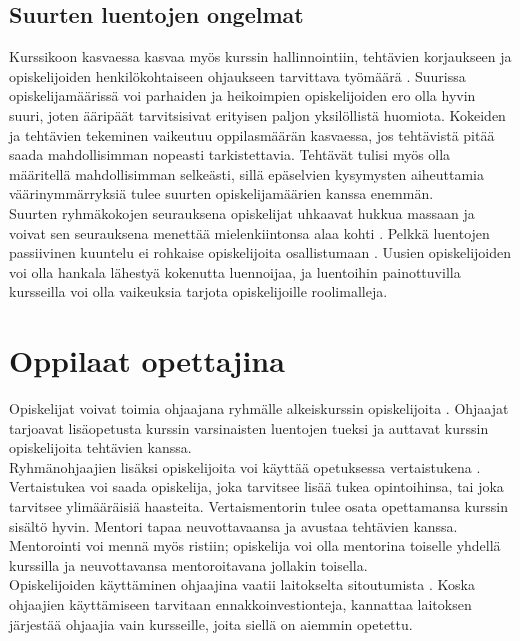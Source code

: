 \documentclass[finnish]{tktltiki2}
\theoremstyle{definition}
\theoremstyle{remark}
\begin{document}
\subsection{Suurten luentojen ongelmat}

Kurssikoon kasvaessa kasvaa myös kurssin hallinnointiin, tehtävien korjaukseen ja opiskelijoiden henkilökohtaiseen ohjaukseen tarvittava työmäärä \cite{Kay98}. Suurissa opiskelijamäärissä voi parhaiden ja heikoimpien opiskelijoiden ero olla hyvin suuri, joten ääripäät tarvitsisivat erityisen paljon yksilöllistä huomiota. Kokeiden ja tehtävien tekeminen vaikeutuu oppilasmäärän kasvaessa, jos tehtävistä pitää saada mahdollisimman nopeasti tarkistettavia. Tehtävät tulisi myös olla määritellä mahdollisimman selkeästi, sillä epäselvien kysymysten aiheuttamia väärinymmärryksiä tulee suurten opiskelijamäärien kanssa enemmän.
\\
Suurten ryhmäkokojen seurauksena opiskelijat uhkaavat hukkua massaan ja voivat sen seurauksena menettää mielenkiintonsa alaa kohti \cite{Kay98}. Pelkkä luentojen passiivinen kuuntelu ei rohkaise opiskelijoita osallistumaan \cite{Kopp00}. Uusien opiskelijoiden voi olla hankala lähestyä kokenutta luennoijaa, ja luentoihin painottuvilla kursseilla voi olla vaikeuksia tarjota opiskelijoille roolimalleja.   


\section{Oppilaat opettajina}
Opiskelijat voivat toimia ohjaajana ryhmälle alkeiskurssin o\-pis\-ke\-li\-joi\-ta \cite{Reges88}. Ohjaajat tarjoavat lisäopetusta kurssin varsinaisten luentojen tueksi ja auttavat kurssin opiskelijoita tehtävien kanssa.
\\
Ryhmänohjaajien lisäksi opiskelijoita voi käyttää opetuksessa vertaistukena \cite{Tashakkori05}. Vertaistukea voi saada opiskelija, joka tarvitsee lisää tukea opintoihinsa, tai joka tarvitsee ylimääräisiä haasteita. Vertaismentorin tulee osata opettamansa  kurssin sisältö hyvin. Mentori tapaa neuvottavaansa ja avustaa tehtävien kanssa. Mentorointi voi mennä myös ristiin; opiskelija voi olla mentorina toiselle yhdellä kurssilla ja neuvottavansa mentoroitavana jollakin toisella.
\\
Opiskelijoiden käyttäminen ohjaajina vaatii laitokselta sitoutumista \cite{Kopp00}. Koska ohjaajien käyttämiseen tarvitaan ennakkoinvestionteja, kannattaa laitoksen järjestää ohjaajia vain kursseille, joita siellä on aiemmin opetettu. 
\end{document}
